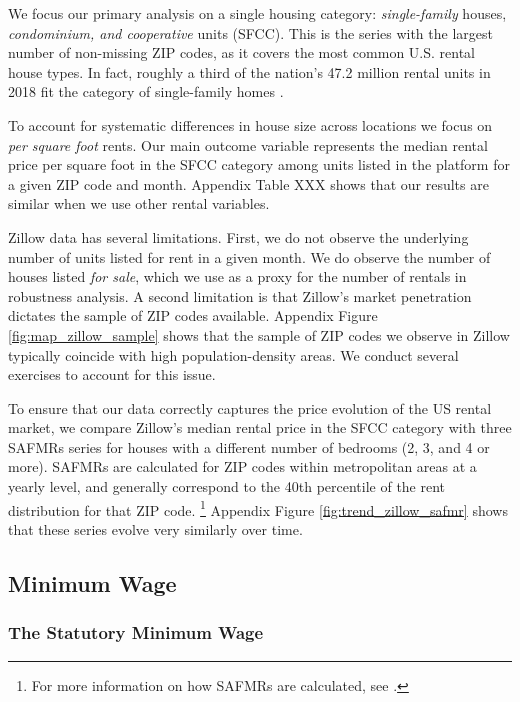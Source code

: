 We focus our primary analysis on a single housing category:
\textit{single-family} houses, \textit{condominium, and cooperative} units (SFCC).
This is the series with the largest number of non-missing ZIP codes, as it 
covers the most common U.S. rental house types.
In fact, roughly a third of the nation's 47.2 million rental units in 2018 fit 
the category of single-family homes \parencite{Fernald2020}.

To account for systematic differences in house size across locations we focus 
on \textit{per square foot} rents.
Our main outcome variable represents the median rental price per square foot in 
the SFCC category among units listed in the platform for a given ZIP code and 
month.
Appendix Table XXX shows that our results are similar when we use other rental 
variables.
%
%

Zillow data has several limitations.
First, we do not observe the underlying number of units listed for rent in a 
given month.
We do observe the number of houses listed \textit{for sale}, which we use as a
proxy for the number of rentals in robustness analysis.
A second limitation is that Zillow's market penetration dictates the sample of 
ZIP codes available.
Appendix Figure \ref{fig:map_zillow_sample} shows that the sample of ZIP codes
we observe in Zillow typically coincide with high population-density areas.
We conduct several exercises to account for this issue.

To ensure that our data correctly captures the price evolution of the US rental 
market, we compare 
Zillow's median rental price in the SFCC category with 
three SAFMRs series for houses with a different number of bedrooms (2, 3, and 
4 or more).
SAFMRs are calculated for ZIP codes within metropolitan areas at a yearly level, 
and generally correspond to the 40th percentile of the rent distribution for 
that ZIP code.%
\footnote{For more information on how SAFMRs are calculated, see 
\textcite[][page 41641]{hudPreamble}.}
Appendix Figure \ref{fig:trend_zillow_safmr} shows that these series evolve
very similarly over time.

\subsection{Minimum Wage}\label{sec:mw_construction}

\subsubsection*{The Statutory Minimum Wage}

